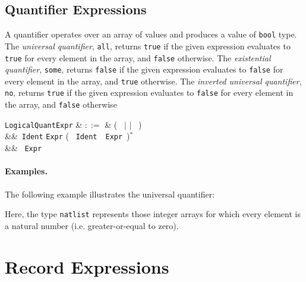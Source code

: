 
\subsection{Quantifier Expressions}
\label{c_expr_quantifier}

A quantifier operates over an array of values and produces a value of \lstinline{bool} type.  The {\em universal quantifier}, \lstinline{all}, returns \lstinline{true} if the given expression evaluates to \lstinline{true} for every element in the array, and \lstinline{false} otherwise.  The {\em existential quantifier}, \lstinline{some}, returns \lstinline{false} if the given expression evaluates to \lstinline{false} for every element in the array, and \lstinline{true} otherwise.  The {\em inverted universal quantifier}, \lstinline{no}, returns \lstinline{true} if the given expression evaluates to \lstinline{false} for every element in the array, and \lstinline{false} otherwise

\begin{syntax}
\verb+LogicalQuantExpr+ & $::=$ & \big(\  $|$  $|$
\ \big)\ \token{\{}\\
&&\ \verb+Ident+  \verb+Expr+ \big( \token{,}\ \verb+Ident+\
\ \verb+Expr+\ \big)$^*$\\
&&  \token{|}\ \verb+Expr+\ \token{\}}\\
\end{syntax}

\paragraph{Examples.}  The following example illustrates the universal quantifier:



Here, the type \lstinline{natlist} represents those integer arrays for which every element is a natural number (i.e. greater-or-equal to zero).


\section{Record Expressions}
\label{c_expr_record}

